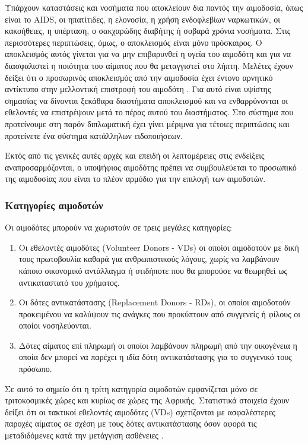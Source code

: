 		Υπάρχουν καταστάσεις και νοσήματα που αποκλείουν δια παντός την αιμοδοσία, όπως είναι το AIDS, οι ηπατίτιδες, η ελονοσία, η χρήση ενδοφλεβίων ναρκωτικών, οι κακοήθειες, η υπέρταση, ο σακχαρώδης διαβήτης ή σοβαρά χρόνια νοσήματα. Στις περισσότερες περιπτώσεις, όμως, ο αποκλεισμός είναι μόνο πρόσκαιρος.  Ο αποκλεισμός αυτός γίνεται για να μην επιβαρυνθεί η υγεία του αιμοδότη και για να διασφαλιστεί η ποιότητα του αίματος που θα μεταγγιστεί στο λήπτη. Μελέτες έχουν δείξει ότι ο προσωρινός αποκλεισμός από την αιμοδοσία έχει έντονο αρνητικό αντίκτυπο στην μελλοντική επιστροφή του αιμοδότη \cite{Custer2011}\cite{Custer2007}. Για αυτό είναι υψίστης σημασίας να δίνονται ξεκάθαρα διαστήματα αποκλεισμού και να ενθαρρύνονται οι εθελοντές να επιστρέψουν μετά το πέρας αυτού του διαστήματος. Στο σύστημα που προτείνουμε στη παρόν διπλωματική έχει γίνει μέριμνα για τέτοιες περιπτώσεις και προτείνετε ένα σύστημα κατάλληλων ειδοποιήσεων.
		
		Εκτός από τις γενικές αυτές αρχές και επειδή οι λεπτομέρειες στις ενδείξεις αναπροσαρμόζονται, ο υποψήφιος αιμοδότης πρέπει να συμβουλεύεται το προσωπικό της αιμοδοσίας που είναι το πλέον αρμόδιο για την επιλογή των αιμοδοτών.
		\subsubsection{Κατηγορίες αιμοδοτών}
			Οι αιμοδότες μπορούν να χωριστούν σε τρεις μεγάλες κατηγορίες:
\begin{enumerate}
	\item Οι εθελοντές αιμοδότες (Volunteer Donors - VDs) οι οποίοι αιμοδοτούν με δική τους πρωτοβουλία καθαρά για ανθρωπιστικούς λόγους, χωρίς να λαμβάνουν κάποιο οικονομικό αντάλλαγμα ή οτιδήποτε που θα μπορούσε να θεωρηθεί ως αντικαταστατό του χρήματος.
	\item Οι δότες αντικατάστασης (Replacement Donors - RDs), οι οποίοι αιμοδοτούν προκειμένου να καλύψουν τις ανάγκες που προκύπτουν από συγγενείς ή φίλους οι οποίοι νοσηλεύονται.
	\item Δότες αίματος επί πληρωμή οι οποίοι λαμβάνουν πληρωμή από την οικογένεια η οποία δεν μπορεί να παρέχει η ιδία δότη αντικατάστασης για το συγγενικό τους πρόσωπο.
\end{enumerate} 

		Σε αυτό το σημείο ότι η τρίτη κατηγορία αιμοδοτών εμφανίζεται μόνο σε τριτοκοσμικές χώρες και κυρίως σε χώρες της Αφρικής. Στατιστικά στοιχεία έχουν δείξει ότι οι τακτικοί εθελοντές αιμοδότες (VDs) σχετίζονται με ασφαλέστερες παροχές αίματος σε σχέση με τους δότες αντικατάστασης όσον αφορά τις μεταδιδόμενες κατά την μετάγγιση ασθένειες \cite{Liu1998}.

